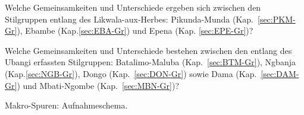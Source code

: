 \begin{itemize*}
\begin{itemize*}
		\item Welche Gemeinsamkeiten und Unterschiede ergeben sich zwischen den Stilgruppen entlang des Likwala-aux-Herbes: Pikunda-Munda (Kap.~\ref{sec:PKM-Gr}), Ebambe (Kap.\linebreak\ref{sec:EBA-Gr}) und Epena (Kap. \ref{sec:EPE-Gr})?
		\item Welche Gemeinsamkeiten und Unterschiede bestehen zwischen den entlang des Ubangi erfassten Stilgruppen: Batalimo-Maluba (Kap.~\ref{sec:BTM-Gr}), Ngbanja (Kap.\ref{sec:NGB-Gr}), Dongo (Kap.~\ref{sec:DON-Gr}) sowie Dama (Kap.~\ref{sec:DAM-Gr}) und Mbati-Ngombe (Kap.~\ref{sec:MBN-Gr})?
	\end{itemize*}
\end{itemize*}

\begin{table*}[tb]
	\centering
	
	\caption{Makro-Spuren: Aufnahmeschema.}
	\label{tab:Makrospuren_Liste}
\end{table*}

